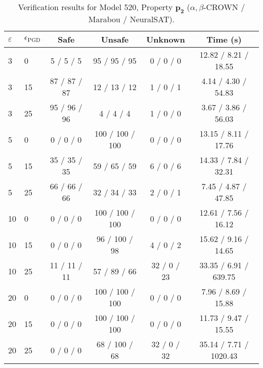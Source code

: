 \begin{table}[htbp]\centering
\caption{\small Verification results for Model 520, Property $\mathbf{p_{2}}$ ($\alpha,\beta$-CROWN / Marabou / NeuralSAT).}
\label{tab:model520_p2}
\begin{tabular}{llcccc}
\toprule
$\varepsilon$ & $\epsilon_{\scriptscriptstyle\mathrm{PGD}}$ & Safe & Unsafe & Unknown & Time (s) \\
\midrule
3 & 0 & 5 / 5 / 5 & 95 / 95 / 95 & 0 / 0 / 0 & 12.82 / 8.21 / 18.55 \\
3 & 15 & 87 / 87 / 87 & 12 / 13 / 12 & 1 / 0 / 1 & 4.14 / 4.30 / 54.83 \\
3 & 25 & 95 / 96 / 96 & 4 / 4 / 4 & 1 / 0 / 0 & 3.67 / 3.86 / 56.03 \\
5 & 0 & 0 / 0 / 0 & 100 / 100 / 100 & 0 / 0 / 0 & 13.15 / 8.11 / 17.76 \\
5 & 15 & 35 / 35 / 35 & 59 / 65 / 59 & 6 / 0 / 6 & 14.33 / 7.84 / 32.31 \\
5 & 25 & 66 / 66 / 66 & 32 / 34 / 33 & 2 / 0 / 1 & 7.45 / 4.87 / 47.85 \\
10 & 0 & 0 / 0 / 0 & 100 / 100 / 100 & 0 / 0 / 0 & 12.61 / 7.56 / 16.12 \\
10 & 15 & 0 / 0 / 0 & 96 / 100 / 98 & 4 / 0 / 2 & 15.62 / 9.16 / 14.65 \\
10 & 25 & 11 / 11 / 11 & 57 / 89 / 66 & 32 / 0 / 23 & 33.35 / 6.91 / 639.75 \\
20 & 0 & 0 / 0 / 0 & 100 / 100 / 100 & 0 / 0 / 0 & 7.96 / 8.69 / 15.88 \\
20 & 15 & 0 / 0 / 0 & 100 / 100 / 100 & 0 / 0 / 0 & 11.73 / 9.47 / 15.55 \\
20 & 25 & 0 / 0 / 0 & 68 / 100 / 68 & 32 / 0 / 32 & 35.14 / 7.71 / 1020.43 \\
\bottomrule
\end{tabular}
\end{table}
